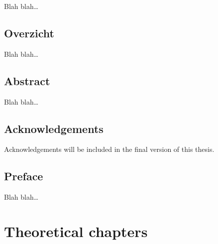 \documentclass[a4paper,12pt,twoside,openright,oldfontcommands]{memoir}
\newcommand{\initial}[1]{
	\lettrine[lines=3,lhang=0.33,nindent=0em]{
		\color{gray}
     		{\textsc{#1}}}{}}
\newcommand\blankpage{%
    \null
    \thispagestyle{empty}%
    \newpage
    }
\begin{document}
\initial{B}lah blah\ldots{}

\afterpage{\blankpage}

\chapter*{Overzicht}

\initial{B}lah blah\ldots{}

\afterpage{\blankpage}

\chapter*{Abstract}

\initial{B}lah blah\ldots{}

\afterpage{\blankpage}

\chapter*{Acknowledgements}

\initial{A}cknowledgements will be included in the final version of this
thesis.

\afterpage{\blankpage}

\chapter*{Preface}

\initial{B}lah blah\ldots{}

\newpage

\blankpage

\renewcommand{\contentsname}{Table of contents}

 \tableofcontents*
{}
\newpage

\listoftables
{}
\newpage

\listoffigures
{}
\newpage


\part{Theoretical chapters}\label{part-theoretical-chapters}
\end{document}
